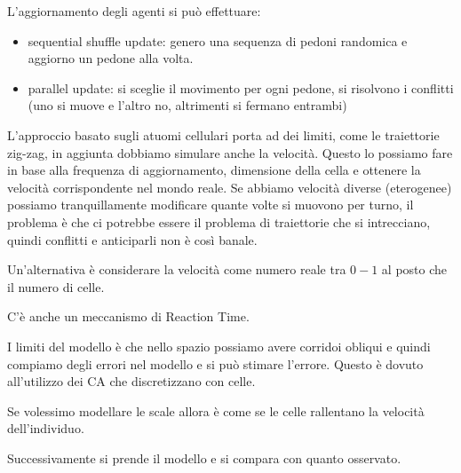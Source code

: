 L'aggiornamento degli agenti si può effettuare:
\begin{itemize}
    \item sequential shuffle update: genero 
    una sequenza di pedoni randomica e aggiorno un pedone alla volta.
    \item parallel update: si sceglie il movimento per ogni pedone, si risolvono 
    i conflitti (uno si muove e l'altro no, altrimenti si fermano entrambi)    
\end{itemize} 
L'approccio basato sugli atuomi cellulari porta ad dei limiti, come le traiettorie 
zig-zag, in aggiunta dobbiamo simulare anche la velocità. Questo lo possiamo fare 
in base alla frequenza di aggiornamento, dimensione della cella e ottenere la 
velocità corrispondente nel mondo reale. Se abbiamo velocità diverse (eterogenee)
possiamo tranquillamente modificare quante volte si muovono per turno, il problema
è che ci potrebbe essere il problema di traiettorie che si intrecciano, quindi 
conflitti e anticiparli non è così banale.

Un'alternativa è considerare la velocità come numero reale tra $0-1$ al posto che 
il numero di celle.

C'è anche un meccanismo di Reaction Time.

I limiti del modello è che nello spazio possiamo avere corridoi obliqui e quindi 
compiamo degli errori nel modello e si può stimare l'errore. Questo è dovuto all'utilizzo
dei CA che discretizzano con celle. 

Se volessimo modellare le scale allora è come se le celle rallentano la velocità 
dell'individuo.

Successivamente si prende il modello e si compara con quanto osservato.